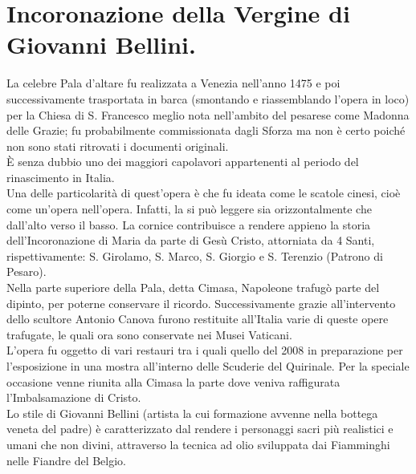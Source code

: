 \documentclass[12pt,a4paper]{article}
\begin{document}
	\section{Incoronazione della Vergine di Giovanni Bellini.}
	La celebre Pala d'altare fu realizzata a Venezia nell'anno 1475 e poi successivamente trasportata in barca (smontando e riassemblando l'opera in loco) per la Chiesa di S. Francesco meglio nota nell'ambito del pesarese come Madonna delle Grazie; fu probabilmente commissionata dagli Sforza ma non è certo poiché non sono stati ritrovati i documenti originali.\\
	È senza dubbio uno dei maggiori capolavori appartenenti al periodo del rinascimento in Italia.\\
	Una delle particolarità di quest'opera è che fu ideata come le scatole cinesi, cioè come un’opera nell'opera. Infatti, la si può leggere sia orizzontalmente che dall'alto verso il basso. La cornice contribuisce a rendere appieno la storia dell'Incoronazione di Maria da parte di Gesù Cristo, attorniata da 4 Santi, rispettivamente: S. Girolamo, S. Marco, S. Giorgio e S. Terenzio (Patrono di Pesaro). \\
	Nella parte superiore della Pala, detta Cimasa, Napoleone trafugò parte del dipinto, per poterne conservare il ricordo. Successivamente grazie all'intervento dello scultore Antonio Canova furono restituite all'Italia varie di queste opere trafugate, le quali ora sono conservate nei Musei Vaticani.\\
	L'opera fu oggetto di vari restauri tra i quali quello del 2008 in preparazione per l'esposizione in una mostra all'interno delle Scuderie del Quirinale. Per la speciale occasione venne riunita alla Cimasa la parte dove veniva raffigurata l’Imbalsamazione di Cristo.\\
	Lo stile di Giovanni Bellini (artista la cui formazione avvenne nella bottega veneta del padre)  è caratterizzato dal rendere i personaggi sacri più realistici e umani che non divini, attraverso la tecnica ad olio sviluppata dai Fiamminghi nelle Fiandre del Belgio.
	
\end{document}
